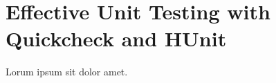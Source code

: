 \section{Effective Unit Testing with Quickcheck and HUnit}
\label{section:testing}


Lorum ipsum sit dolor amet.  \lipsum[2-4]
